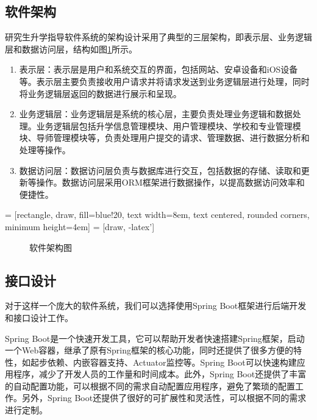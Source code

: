 \documentclass[UTF8]{ctexart}
\newcommand{\m}[1]{\textcolor{modify}{#1}}
\begin{document}
    \subsection{软件架构}
    \par
    研究生升学指导软件系统的架构设计采用了典型的三层架构，即表示层、业务逻辑层和数据访问层，结构如图\ref{fig:structure}所示。
    \m{
        \begin{enumerate}
            \item 表示层：表示层是用户和系统交互的界面，包括网站、安卓设备和iOS设备等。表示层主要负责接收用户请求并将请求发送到业务逻辑层进行处理，同时将业务逻辑层返回的数据进行展示和呈现。
            \item 业务逻辑层：业务逻辑层是系统的核心层，主要负责处理业务逻辑和数据处理。业务逻辑层包括升学信息管理模块、用户管理模块、学校和专业管理模块、导师管理模块等，负责处理用户提交的请求、管理数据、进行数据分析和处理等操作。
            \item 数据访问层：数据访问层负责与数据库进行交互，包括数据的存储、读取和更新等操作。数据访问层采用ORM框架进行数据操作，以提高数据访问效率和便捷性。
        \end{enumerate}
    }
     = [rectangle, draw, fill=blue!20, text width=8em, text centered, rounded corners, minimum height=4em]
     = [draw, -latex']
    \begin{figure}
        \begin{center}
            \caption{软件架构图}
            \label{fig:structure}
        \end{center}
        
    \end{figure}
    \subsection{接口设计}
    \par
    对于这样一个庞大的软件系统，我们可以选择使用Spring Boot框架进行后端开发和接口设计工作。
    \par
    \m{Spring Boot是一个快速开发工具，它可以帮助开发者快速搭建Spring框架，启动一个Web容器，继承了原有Spring框架的核心功能，同时还提供了很多方便的特性，如起步依赖、内嵌容器支持、Actuator监控等。Spring Boot可以快速构建应用程序，减少了开发人员的工作量和时间成本。此外，Spring Boot还提供了丰富的自动配置功能，可以根据不同的需求自动配置应用程序，避免了繁琐的配置工作。另外，Spring Boot还提供了很好的可扩展性和灵活性，可以根据不同的需求进行定制。}
    
\end{document}
